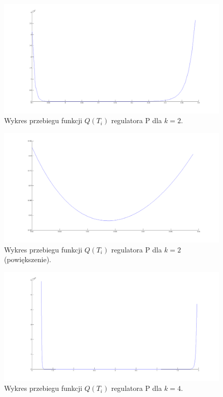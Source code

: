 \documentclass[a4paper,10pt]{article}
\begin{document}
\begin{figure}[!h]
    \centering
	\includegraphics[width=130mm]{CW2-regulatorPI-k2-opt1.png}
	\caption{Wykres przebiegu funkcji $Q(T_{i})$ regulatora P dla $k=2$.}
    \label{fig:regulatorPIk2opt1}
\end{figure}
\begin{figure}[!h]
    \centering
	\includegraphics[width=130mm]{CW2-regulatorPI-k2-opt2.png}
	\caption{Wykres przebiegu funkcji $Q(T_{i})$ regulatora P dla $k=2$ (powiększenie).}
    \label{fig:regulatorPIk2opt2}
\end{figure}
\begin{figure}[!h]
    \centering
	\includegraphics[width=130mm]{CW2-regulatorPI-k4-opt1.png}
	\caption{Wykres przebiegu funkcji $Q(T_{i})$ regulatora P dla $k=4$.}
    \label{fig:regulatorPIk4opt1}
\end{figure}
\end{document}
